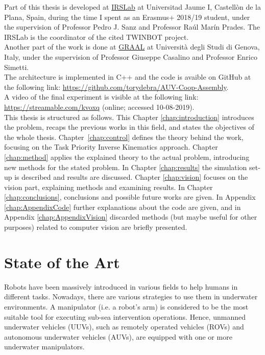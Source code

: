 Part of this thesis is developed at \href{http://www.irs.uji.es/}{IRSLab} at Universitad Jaume I, Castell\`{o}n de la Plana, Spain, during the time I spent as an Erasmus+ 2018/19 student, under the supervision of Professor Pedro J. Sanz and Professor Ra\'{u}l Mar\'{i}n Prades. The IRSLab is the coordinator of the cited TWINBOT project. \\
Another part of the work is done at \href{http://www.graal.dibris.unige.it/}{GRAAL} at Universit\`{a} degli Studi di Genova, Italy, under the supervision of Professor Giuseppe Casalino and Professor Enrico Simetti.\\
The architecture is implemented in C++ and the code is avaible on GitHub at the following link:  \url{https://github.com/torydebra/AUV-Coop-Assembly}.\\
A video of the final experiment is visible at the following link: \url{https://streamable.com/kvoxq} (online; accessed 10-08-2019).\\

This thesis is structured as follows. This Chapter \ref{chap:introduction} introduces the problem, recaps the previous works in this field, and states the objectives of the whole thesis. \mbox{Chapter \ref{chap:control}} defines the theory behind the work, focusing on the Task Priority Inverse Kinematics approach. Chapter \ref{chap:method} applies the explained theory to the actual problem, introducing new methods for the stated problem. In Chapter \ref{chap:results} the simulation set-up is described and results are discussed. Chapter \ref{chap:vision} focuses on the vision part, explaining methods and examining results. In Chapter \ref{chap:conclusions}, conclusions and possible future works are given. In Appendix \ref{chap:AppendixCode} further explanations about the code are given, and in Appendix \ref{chap:AppendixVision} discarded methods (but maybe useful for other purposes) related to computer vision are briefly presented.

\section{State of the Art}
\label{sec:stateArt}
Robots have been massively introduced in various fields to help humans in different tasks. Nowadays, there are various strategies to use them in underwater environments. A manipulator (i.e. a robot's arm) is considered to be the most suitable tool for executing sub-sea intervention operations. Hence, unmanned underwater vehicles (UUVs), such as remotely operated vehicles (ROVs) and autonomous underwater vehicles (AUVs), are equipped with one or more underwater manipulators.

